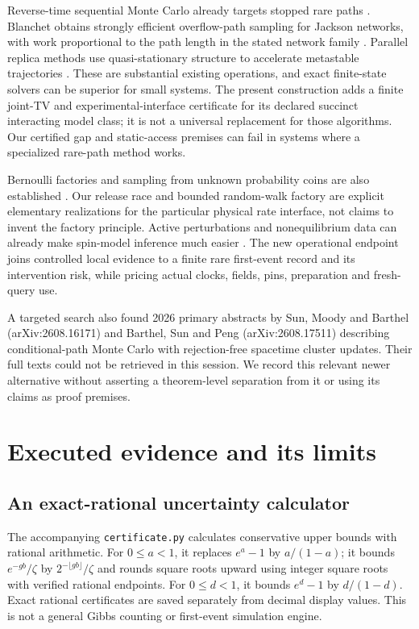 Reverse-time sequential Monte Carlo already targets stopped rare paths
\cite{reverse}. Blanchet obtains strongly efficient overflow-path
sampling for Jackson networks, with work proportional to the path length
in the stated network family \cite{blanchet}. Parallel replica methods
use quasi-stationary structure to accelerate metastable trajectories
\cite{parrep}. These are substantial existing operations, and exact
finite-state solvers can be superior for small systems. The present
construction adds a finite joint-TV and experimental-interface certificate
for its declared succinct interacting model class; it is not a universal
replacement for those algorithms. Our certified gap and static-access
premises can fail in systems where a specialized rare-path method works.

Bernoulli factories and sampling from unknown probability coins are also
established \cite{huber,bernoullirace}. Our release race and bounded random-walk
factory are explicit elementary realizations for the particular physical
rate interface, not claims to invent the factory principle. Active
perturbations and nonequilibrium data can already make spin-model
inference much easier \cite{activefields,dutt}. The new operational
endpoint joins controlled local evidence to a finite rare first-event
record and its intervention risk, while pricing actual clocks, fields,
pins, preparation and fresh-query use.

A targeted search also found 2026 primary abstracts by Sun, Moody and
Barthel (arXiv:2608.16171) and Barthel, Sun and Peng
(arXiv:2608.17511) describing conditional-path Monte Carlo with
rejection-free spacetime cluster updates. Their full texts could not be
retrieved in this session. We record this relevant newer alternative
without asserting a theorem-level separation from it or using its
claims as proof premises.

\section{Executed evidence and its limits}
\subsection{An exact-rational uncertainty calculator}
The accompanying \texttt{certificate.py} calculates conservative
upper bounds with rational arithmetic. For $0\le a<1$, it replaces
$e^a-1$ by $a/(1-a)$; it bounds $e^{-gb}/\zeta$ by
$2^{-\lfloor gb\rfloor}/\zeta$ and rounds square roots upward using
integer square roots with verified rational endpoints. For
$0\le d<1$, it bounds $e^d-1$ by $d/(1-d)$. Exact rational
certificates are saved separately from decimal display values.
This is not a general Gibbs counting or first-event simulation engine.

